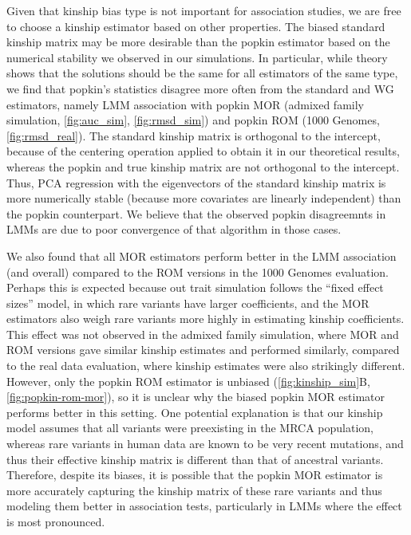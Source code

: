 \documentclass[11pt]{article}
\begin{document}
Given that kinship bias type is not important for association studies, we are free to choose a kinship estimator based on other properties.
The biased standard kinship matrix may be more desirable than the popkin estimator based on the numerical stability we observed in our simulations.
In particular, while theory shows that the solutions should be the same for all estimators of the same type, we find that popkin's statistics disagree more often from the standard and WG estimators, namely LMM association with popkin MOR (admixed family simulation, \cref{fig:auc_sim}, \cref{fig:rmsd_sim}) and popkin ROM (1000 Genomes, \cref{fig:rmsd_real}).
The standard kinship matrix is orthogonal to the intercept, because of the centering operation applied to obtain it in our theoretical results, whereas the popkin and true kinship matrix are not orthogonal to the intercept.
Thus, PCA regression with the eigenvectors of the standard kinship matrix is more numerically stable (because more covariates are linearly independent) than the popkin counterpart.
We believe that the observed popkin disagreemnts in LMMs are due to poor convergence of that algorithm in those cases.

We also found that all MOR estimators perform better in the LMM association (and overall) compared to the ROM versions in the 1000 Genomes evaluation.
Perhaps this is expected because out trait simulation follows the ``fixed effect sizes'' model, in which rare variants have larger coefficients, and the MOR estimators also weigh rare variants more highly in estimating kinship coefficients.
This effect was not observed in the admixed family simulation, where MOR and ROM versions gave similar kinship estimates and performed similarly, compared to the real data evaluation, where kinship estimates were also strikingly different.
However, only the popkin ROM estimator is unbiased (\cref{fig:kinship_sim}B, \cref{fig:popkin-rom-mor}), so it is unclear why the biased popkin MOR estimator performs better in this setting.
One potential explanation is that our kinship model assumes that all variants were preexisting in the MRCA population, whereas rare variants in human data are known to be very recent mutations, and thus their effective kinship matrix is different than that of ancestral variants.
Therefore, despite its biases, it is possible that the popkin MOR estimator is more accurately capturing the kinship matrix of these rare variants and thus modeling them better in association tests, particularly in LMMs where the effect is most pronounced.
\end{document}
